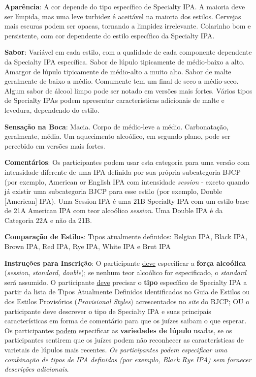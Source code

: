 \textbf{Aparência}: A cor depende do tipo específico de Specialty IPA. A maioria deve ser límpida, mas uma leve turbidez é aceitável na maioria dos estilos. Cervejas mais escuras podem ser opacas, tornando a limpidez irrelevante. Colarinho bom e persistente, com cor dependente do estilo específico da Specialty IPA.

\textbf{Sabor}: Variável em cada estilo, com a qualidade de cada componente dependente da Specialty IPA específica. Sabor de lúpulo tipicamente de médio-baixo a alto. Amargor de lúpulo tipicamente de médio-alto a muito alto. Sabor de malte geralmente de baixo a médio. Comumente tem um final de seco a médio-seco. Algum sabor de álcool limpo pode ser notado em versões mais fortes. Vários tipos de Specialty IPAs podem apresentar características adicionais de malte e levedura, dependendo do estilo.

\textbf{Sensação na Boca}: Macia. Corpo de médio-leve a médio. Carbonatação, geralmente, média. Um aquecimento alcoólico, em segundo plano, pode ser percebido em versões mais fortes.

\textbf{Comentários}: Os participantes podem usar esta categoria para uma versão com intensidade diferente de uma IPA definida por sua própria subcategoria BJCP (por exemplo, American or English IPA com intensidade \textit{session} - exceto quando já existir uma subcategoria BJCP para esse estilo (por exemplo, Double [American] IPA). Uma Session IPA é uma 21B Specialty IPA com um estilo base de 21A American IPA com teor alcoólico \textit{session}. Uma Double IPA é da Categoria 22A e não da 21B.

\textbf{Comparação de Estilos}: Tipos atualmente definidos: Belgian IPA, Black IPA, Brown IPA, Red IPA, Rye IPA, White IPA e Brut IPA

\textbf{Instruções para Inscrição}: O participante \underline{deve} especificar a \textbf{força alcoólica} (\textit{session}, \textit{standard}, \textit{double}); se nenhum teor alcoólico for especificado, o \textit{standard} será assumido. O participante \underline{deve} precisar o \textbf{tipo} específico de Specialty IPA a partir da lista de Tipos Atualmente Definidos identificados no Guia de Estilos ou dos Estilos Provisórios (\textit{Provisional Styles}) acrescentados no \textit{site} do BJCP; OU o participante deve descrever o tipo de Specialty IPA e suas principais características em forma de comentário para que os juízes saibam o que esperar. Os participantes \underline{podem} especificar as \textbf{variedades de lúpulo} usadas, se os participantes sentirem que os juízes podem não reconhecer as características de varietais de lúpulos mais recentes. \textit{Os participantes podem especificar uma combinação de tipos de IPA definidos (por exemplo, Black Rye IPA) sem fornecer descrições adicionais}.

